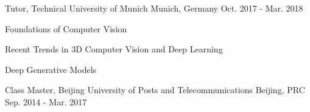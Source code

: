 


\begin{cventries}


\cventry
{} %
{Tutor, Technical University of Munich} %
{Munich, Germany} %
{Oct. 2017 - Mar. 2018} %
{ %
\begin{cvitems}
\item {Foundations of Computer Vision}
\item {Recent Trends in 3D Computer Vision and Deep Learning}
\item {Deep Generative Models}
\end{cvitems}
}

\cventry
{} %
{Class Master, Beijing University of Posts and Telecommunications} %
{Beijing, PRC} %
{Sep. 2014 - Mar. 2017} %
{
}


\end{cventries}

